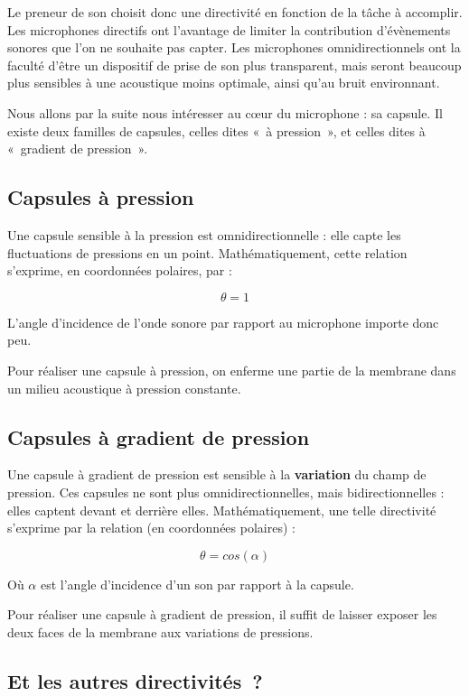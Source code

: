 \documentclass[
]{book}
\begin{document}
Le preneur de son choisit donc une directivité en fonction de la tâche à accomplir. Les microphones directifs ont l'avantage de limiter la contribution d'évènements sonores que l'on ne souhaite pas capter. Les microphones omnidirectionnels ont la faculté d'être un dispositif de prise de son plus transparent, mais seront beaucoup plus sensibles à une acoustique moins optimale, ainsi qu'au bruit environnant.

Nous allons par la suite nous intéresser au cœur du microphone : sa capsule. Il existe deux familles de capsules, celles dites «~à pression~», et celles dites à «~gradient de pression~».

\hypertarget{capsules-uxe0-pression}{%
\subsection{Capsules à pression}\label{capsules-uxe0-pression}}

Une capsule sensible à la pression est omnidirectionnelle : elle capte les fluctuations de pressions en un point. Mathématiquement, cette relation s'exprime, en coordonnées polaires, par :

\[ \theta = 1 \]

L'angle d'incidence de l'onde sonore par rapport au microphone importe donc peu.

Pour réaliser une capsule à pression, on enferme une partie de la membrane dans un milieu acoustique à pression constante.

\hypertarget{capsules-uxe0-gradient-de-pression}{%
\subsection{Capsules à gradient de pression}\label{capsules-uxe0-gradient-de-pression}}

Une capsule à gradient de pression est sensible à la \textbf{variation} du champ de pression. Ces capsules ne sont plus omnidirectionnelles, mais bidirectionnelles : elles captent devant et derrière elles. Mathématiquement, une telle directivité s'exprime par la relation (en coordonnées polaires) :

\[ \theta = cos(\alpha) \]

Où \(\alpha\) est l'angle d'incidence d'un son par rapport à la capsule.

Pour réaliser une capsule à gradient de pression, il suffit de laisser exposer les deux faces de la membrane aux variations de pressions.

\hypertarget{et-les-autres-directivituxe9s}{%
\subsection{Et les autres directivités~?}\label{et-les-autres-directivituxe9s}}
\end{document}
